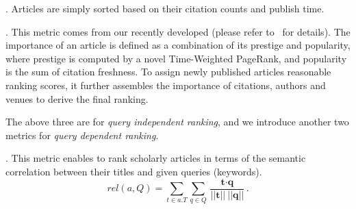 




. Articles are simply sorted based on their citation counts and publish time. %


. This metric comes from our recently developed \sarank (please refer to~\cite{ma2018query} for details). The importance of an article is defined as a combination of its prestige and popularity, where prestige is computed by a novel Time-Weighted PageRank, and popularity is the sum of citation freshness. To assign newly published articles reasonable ranking scores, it further assembles the importance of citations, authors and venues to derive the final ranking. %

The above three are for {\em query independent ranking}, and we introduce another two metrics for {\em query dependent ranking}.

. This metric enables to rank scholarly articles in terms of the semantic correlation between their titles and given queries (keywords). 
%
%
\begin{equation}
\label{eq:relscore}
rel(a, Q) = \sum_{t \in a.T} \sum_{q \in Q} \frac {\textbf{t} \cdot \textbf{q}} {|| \textbf{t} ||\ ||\textbf{q}||}.
\end{equation}

